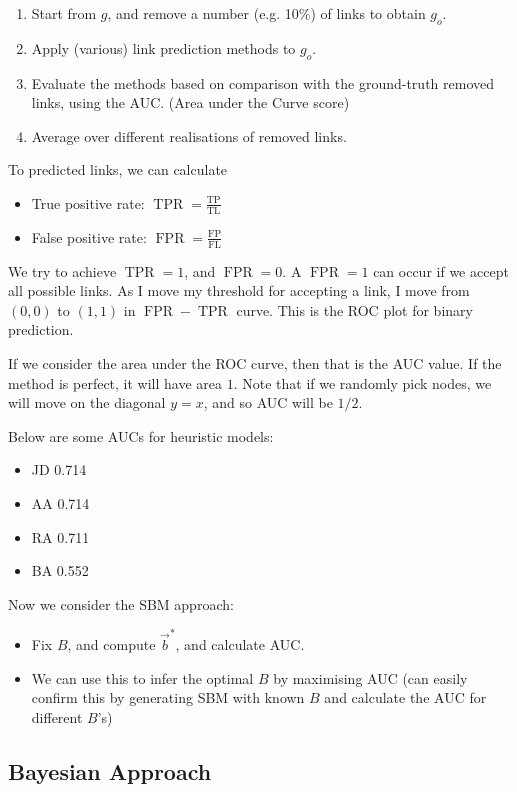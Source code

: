 \documentclass[12pt]{article}
\theoremstyle{definition}
\begin{document}
\begin{enumerate}
    \item Start from $g$, and remove a number (e.g. 10\%) of links to obtain $g_o$. 
    \item Apply (various) link prediction methods to $g_o$. 
    \item Evaluate the methods based on comparison with the ground-truth removed links, using the AUC. (Area under the Curve score)
    \item Average over different realisations of removed links. 
\end{enumerate}
To predicted links, we can calculate
\begin{itemize}
    \item True positive rate: $\operatorname{TPR}=\frac{\mathrm{TP}}{\mathrm{TL}}$ 
    \item False positive rate: $\operatorname{FPR} = \frac{\mathrm{FP}}{\mathrm{FL}}$
\end{itemize}

We try to achieve $\operatorname{TPR}=1$, and $\operatorname{FPR}=0$. A $\operatorname{FPR}=1$ can occur if we accept all possible links. As I move my threshold for accepting a link, I move from $(0,0)$ to $(1,1)$ in $\operatorname{FPR}-\operatorname{TPR}$ curve. This is the ROC plot for binary prediction. 

If we consider the area under the ROC curve, then that is the AUC value. If the method is perfect, it will have area $1$. Note that if we randomly pick nodes, we will move on the diagonal $y=x$, and so AUC will be $1/2$.

Below are some AUCs for heuristic models: 
\begin{itemize}
    \item JD 0.714
    \item AA 0.714
    \item RA 0.711
    \item BA 0.552
\end{itemize}

Now we consider the SBM approach: 
\begin{itemize}
    \item Fix $B$, and compute $\vec{b}^*$, and calculate AUC. 
    \item We can use this to infer the optimal $B$ by maximising AUC (can easily confirm this by generating SBM with known $B$ and calculate the AUC for different $B$'s)
\end{itemize}


\subsection{Bayesian Approach}
\end{document}
